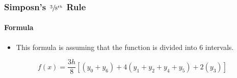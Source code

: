 \subsubsection{Simposn's $\sfrac{3}{8^{th}}$ Rule}

\paragraph{Formula}
\begin{itemize}
    \item This formula is assuming that the function is divided into 6 intervals.
\end{itemize}
\[ f(x) = \frac{3h}{8}[(y_0 + y_6) + 4( y_1 + y_2 + y_4 + y_5 ) + 2(y_3)] \]